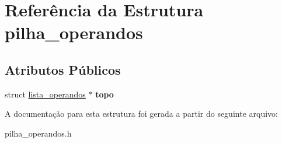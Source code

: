 \hypertarget{structpilha__operandos}{}\section{Referência da Estrutura pilha\+\_\+operandos}
\label{structpilha__operandos}
\subsection*{Atributos Públicos}
\begin{DoxyCompactItemize}
\item 
\mbox{\label{structpilha__operandos_a993dd7722eed1663f266c36ecf0b8417}} 
struct \hyperlink{structlista__operandos}{lista\+\_\+operandos} $\ast$ {\bfseries topo}
\end{DoxyCompactItemize}


A documentação para esta estrutura foi gerada a partir do seguinte arquivo\+:\begin{DoxyCompactItemize}
\item 
pilha\+\_\+operandos.\+h\end{DoxyCompactItemize}
